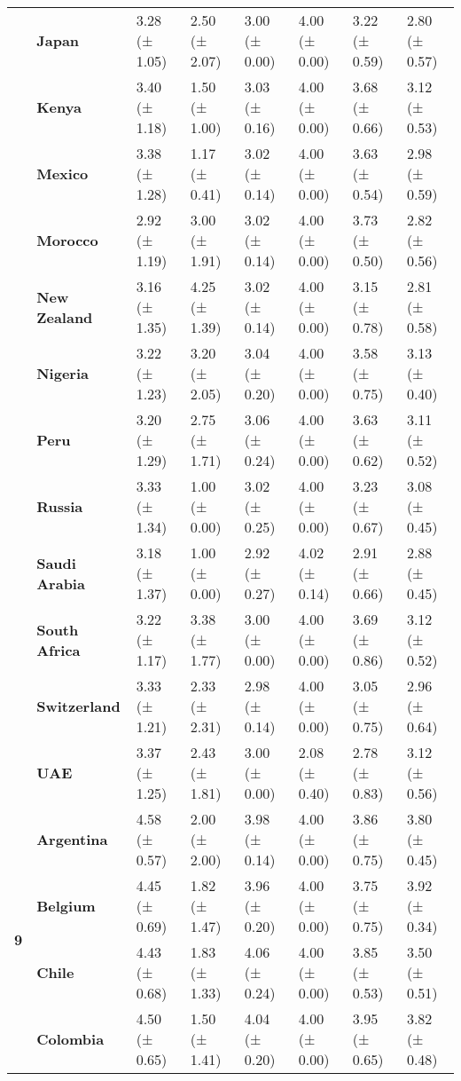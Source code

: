 \begin{longtable}{llllllll}
\textbf{} & \textbf{Japan} & 3.28 (± 1.05) & 2.50 (± 2.07) & 3.00 (± 0.00) & 4.00 (± 0.00) & 3.22 (± 0.59) & 2.80 (± 0.57) \\
\textbf{} & \textbf{Kenya} & 3.40 (± 1.18) & 1.50 (± 1.00) & 3.03 (± 0.16) & 4.00 (± 0.00) & 3.68 (± 0.66) & 3.12 (± 0.53) \\
\textbf{} & \textbf{Mexico} & 3.38 (± 1.28) & 1.17 (± 0.41) & 3.02 (± 0.14) & 4.00 (± 0.00) & 3.63 (± 0.54) & 2.98 (± 0.59) \\
\textbf{} & \textbf{Morocco} & 2.92 (± 1.19) & 3.00 (± 1.91) & 3.02 (± 0.14) & 4.00 (± 0.00) & 3.73 (± 0.50) & 2.82 (± 0.56) \\
\textbf{} & \textbf{New Zealand} & 3.16 (± 1.35) & 4.25 (± 1.39) & 3.02 (± 0.14) & 4.00 (± 0.00) & 3.15 (± 0.78) & 2.81 (± 0.58) \\
\textbf{} & \textbf{Nigeria} & 3.22 (± 1.23) & 3.20 (± 2.05) & 3.04 (± 0.20) & 4.00 (± 0.00) & 3.58 (± 0.75) & 3.13 (± 0.40) \\
\textbf{} & \textbf{Peru} & 3.20 (± 1.29) & 2.75 (± 1.71) & 3.06 (± 0.24) & 4.00 (± 0.00) & 3.63 (± 0.62) & 3.11 (± 0.52) \\
\textbf{} & \textbf{Russia} & 3.33 (± 1.34) & 1.00 (± 0.00) & 3.02 (± 0.25) & 4.00 (± 0.00) & 3.23 (± 0.67) & 3.08 (± 0.45) \\
\textbf{} & \textbf{Saudi Arabia} & 3.18 (± 1.37) & 1.00 (± 0.00) & 2.92 (± 0.27) & 4.02 (± 0.14) & 2.91 (± 0.66) & 2.88 (± 0.45) \\
\textbf{} & \textbf{South Africa} & 3.22 (± 1.17) & 3.38 (± 1.77) & 3.00 (± 0.00) & 4.00 (± 0.00) & 3.69 (± 0.86) & 3.12 (± 0.52) \\
\textbf{} & \textbf{Switzerland} & 3.33 (± 1.21) & 2.33 (± 2.31) & 2.98 (± 0.14) & 4.00 (± 0.00) & 3.05 (± 0.75) & 2.96 (± 0.64) \\
\textbf{} & \textbf{UAE} & 3.37 (± 1.25) & 2.43 (± 1.81) & 3.00 (± 0.00) & 2.08 (± 0.40) & 2.78 (± 0.83) & 3.12 (± 0.56) \\
\cline{1-8}
\multirow[t]{19}{*}{\textbf{9}} & \textbf{Argentina} & 4.58 (± 0.57) & 2.00 (± 2.00) & 3.98 (± 0.14) & 4.00 (± 0.00) & 3.86 (± 0.75) & 3.80 (± 0.45) \\
\textbf{} & \textbf{Belgium} & 4.45 (± 0.69) & 1.82 (± 1.47) & 3.96 (± 0.20) & 4.00 (± 0.00) & 3.75 (± 0.75) & 3.92 (± 0.34) \\
\textbf{} & \textbf{Chile} & 4.43 (± 0.68) & 1.83 (± 1.33) & 4.06 (± 0.24) & 4.00 (± 0.00) & 3.85 (± 0.53) & 3.50 (± 0.51) \\
\textbf{} & \textbf{Colombia} & 4.50 (± 0.65) & 1.50 (± 1.41) & 4.04 (± 0.20) & 4.00 (± 0.00) & 3.95 (± 0.65) & 3.82 (± 0.48) \\

\end{longtable}

